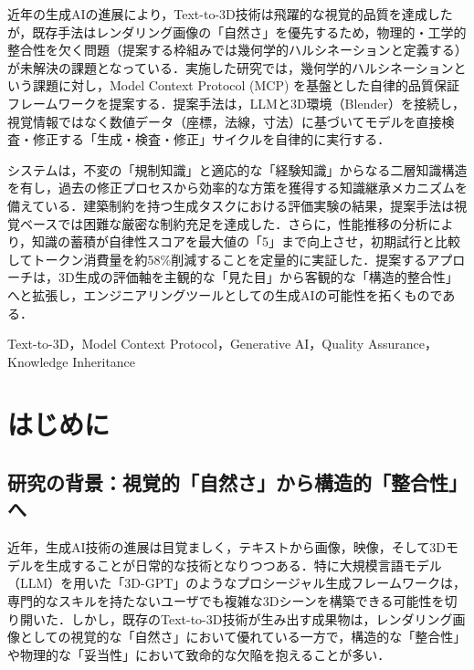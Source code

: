 \documentclass[dvipdfmx, a4paper, 9pt]{deimj}
\begin{document}
\pagestyle{empty}

\begin{jabstract}
近年の生成AIの進展により，Text-to-3D技術は飛躍的な視覚的品質を達成したが，既存手法はレンダリング画像の「自然さ」を優先するため，物理的・工学的整合性を欠く問題（提案する枠組みでは幾何学的ハルシネーションと定義する）が未解決の課題となっている．実施した研究では，幾何学的ハルシネーションという課題に対し，Model Context Protocol (MCP) を基盤とした自律的品質保証フレームワークを提案する．提案手法は，LLMと3D環境（Blender）を接続し，視覚情報ではなく数値データ（座標，法線，寸法）に基づいてモデルを直接検査・修正する「生成・検査・修正」サイクルを自律的に実行する．

システムは，不変の「規制知識」と適応的な「経験知識」からなる二層知識構造を有し，過去の修正プロセスから効率的な方策を獲得する知識継承メカニズムを備えている．建築制約を持つ生成タスクにおける評価実験の結果，提案手法は視覚ベースでは困難な厳密な制約充足を達成した．さらに，性能推移の分析により，知識の蓄積が自律性スコアを最大値の「5」まで向上させ，初期試行と比較してトークン消費量を約58\%削減することを定量的に実証した．提案するアプローチは，3D生成の評価軸を主観的な「見た目」から客観的な「構造的整合性」へと拡張し，エンジニアリングツールとしての生成AIの可能性を拓くものである．
\end{jabstract}

\begin{jkeyword}
Text-to-3D，Model Context Protocol，Generative AI，Quality Assurance，Knowledge Inheritance
\end{jkeyword}

\maketitle

\section{はじめに}

\subsection{研究の背景：視覚的「自然さ」から構造的「整合性」へ}

近年，生成AI技術の進展は目覚ましく，テキストから画像，映像，そして3Dモデルを生成することが日常的な技術となりつつある．特に大規模言語モデル（LLM）を用いた「3D-GPT」\cite{sun20233dgpt}のようなプロシージャル生成フレームワークは，専門的なスキルを持たないユーザでも複雑な3Dシーンを構築できる可能性を切り開いた．しかし，既存のText-to-3D技術が生み出す成果物は，レンダリング画像としての視覚的な「自然さ」において優れている一方で，構造的な「整合性」や物理的な「妥当性」において致命的な欠陥を抱えることが多い．
\end{document}
